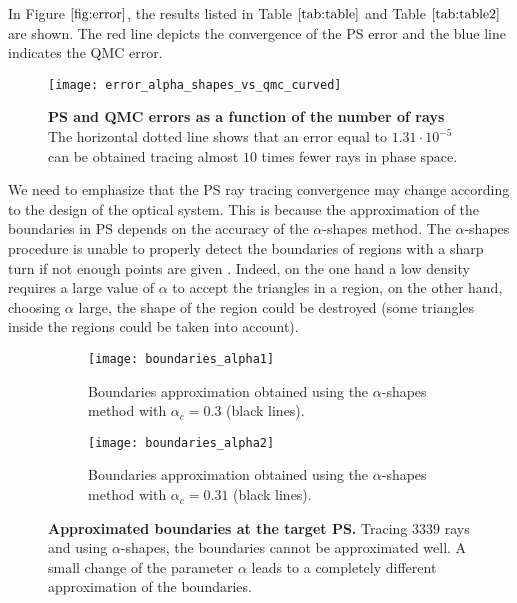 \noindent In Figure $\ref{fig:error}$, the results listed in Table $\ref{tab:table}$ and Table $\ref{tab:table2}$ are shown. The red line depicts the convergence of the PS error and the blue line indicates the QMC error.
\begin{figure}[h]
  \begin{center}
  \texttt{[image: error\_alpha\_shapes\_vs\_qmc\_curved]}
  \end{center}
  \caption{\textbf{PS and QMC errors as a function of the number of rays}
  The horizontal dotted line shows that an error equal to $1.31\cdot  10^{-5}$ can be obtained tracing almost $10$ times fewer rays in phase space.}
  \label{fig:error}
\end{figure}
We need to emphasize that the PS ray tracing convergence may change according to the design of the optical system.
This is because the approximation of the boundaries in PS depends on the accuracy of the $\alpha$-shapes method.
The $\alpha$-shapes procedure is unable to properly detect the boundaries of regions with a sharp turn if not enough points are given
\cite{teichmann1998surface}. Indeed, on the one hand a low density requires a large value of $\alpha$ to accept the triangles in a region, on the other hand,
 choosing $\alpha$ large, the shape of the region could be destroyed (some triangles inside the regions could be taken into account).
\begin{figure}[h]
\centering
\begin{subfigure}{.48\textwidth}
  \centering
  \texttt{[image: boundaries\_alpha1]}
  \caption{Boundaries approximation obtained using the $\alpha$-shapes method with $\alpha_c = 0.3$ (black lines).}
\end{subfigure}
\hfill
\begin{subfigure}{.48\textwidth}
  \centering
  \texttt{[image: boundaries\_alpha2]}
  \caption{Boundaries approximation obtained using the $\alpha$-shapes method with $\alpha_c = 0.31$ (black lines).}
\end{subfigure}
\caption{\textbf{Approximated boundaries at the target PS.} Tracing $3339$ rays and using $\alpha$-shapes, the boundaries cannot be approximated well. 
A small change of the parameter $\alpha$ leads to a completely different approximation of the boundaries.}
\label{fig:Tir1}
\end{figure}
